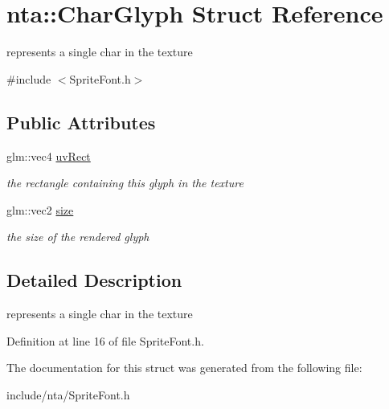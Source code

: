\hypertarget{structnta_1_1CharGlyph}{}\section{nta\+:\+:Char\+Glyph Struct Reference}
\label{structnta_1_1CharGlyph}


represents a single char in the texture  




{\ttfamily \#include $<$Sprite\+Font.\+h$>$}

\subsection*{Public Attributes}
\begin{DoxyCompactItemize}
\item 
\mbox{\label{structnta_1_1CharGlyph_a46d9ea9c38c8bf5e1c1679e938019f53}} 
glm\+::vec4 \hyperlink{structnta_1_1CharGlyph_a46d9ea9c38c8bf5e1c1679e938019f53}{uv\+Rect}
\begin{DoxyCompactList}\small\item\em the rectangle containing this glyph in the texture \end{DoxyCompactList}\item 
\mbox{\label{structnta_1_1CharGlyph_aa2a40e6fe48ffadb4c7c95af7e82db91}} 
glm\+::vec2 \hyperlink{structnta_1_1CharGlyph_aa2a40e6fe48ffadb4c7c95af7e82db91}{size}
\begin{DoxyCompactList}\small\item\em the size of the rendered glyph \end{DoxyCompactList}\end{DoxyCompactItemize}


\subsection{Detailed Description}
represents a single char in the texture 

Definition at line 16 of file Sprite\+Font.\+h.



The documentation for this struct was generated from the following file\+:\begin{DoxyCompactItemize}
\item 
include/nta/Sprite\+Font.\+h\end{DoxyCompactItemize}
